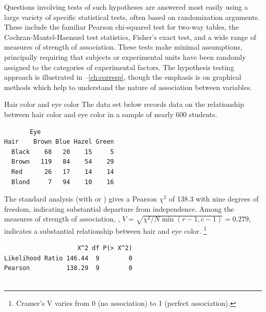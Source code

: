 \documentclass[10pt,krantz2]{krantz}\usepackage[]{graphicx}\usepackage[]{color}
\makeatletter
\newenvironment{kframe}{%
 \def\at@end@of@kframe{}%
 \ifinner\ifhmode%
  \def\at@end@of@kframe{\end{minipage}}%
  \begin{minipage}{\columnwidth}%
 \fi\fi%
 \def\FrameCommand##1{\hskip\@totalleftmargin \hskip-\fboxsep
 \colorbox{shadecolor}{##1}\hskip-\fboxsep
     \hskip-\linewidth \hskip-\@totalleftmargin \hskip\columnwidth}%
 \MakeFramed {\advance\hsize-\width
   \@totalleftmargin\z@ \linewidth\hsize
   \@setminipage}}%
 {\par\unskip\endMakeFramed%
 \at@end@of@kframe}
\newenvironment{knitrout}{}{} %
\renewenvironment{knitrout}{\small\renewcommand{\baselinestretch}{.85}}{} %
\makeatother
\begin{document}
Questions involving tests of such hypotheses are answered most easily
using a large variety of specific statistical tests, often based on
randomization arguments.
These include the familiar Pearson chi-squared test for two-way tables,
the Cochran-Mantel-Haenszel test statistics, Fisher's exact test, and a wide range of measures of strength of association.
These tests make minimal assumptions, principally requiring that subjects
or experimental units have been randomly assigned to the categories of
experimental factors.  The hypothesis testing approach is illustrated
in --\ref{ch:corresp}, though the emphasis is on graphical
methods which help to understand the nature of association between
variables.

\begin{Example}[haireye0]{Hair color and eye color}
%
The data set  below
records data on the relationship between hair color and eye color
in a sample of nearly 600 students.
\begin{knitrout}
\color{fgcolor}\begin{kframe}
\begin{verbatim}
       Eye
Hair    Brown Blue Hazel Green
  Black    68   20    15     5
  Brown   119   84    54    29
  Red      26   17    14    14
  Blond     7   94    10    16
\end{verbatim}
\end{kframe}
\end{knitrout}

The standard analysis (with  or )
gives a
Pearson \(\chi^2\) of 138.3 with nine degrees of freedom,
indicating substantial departure from independence.  Among the measures of
strength of association, , $V = \sqrt{\chi^2 / N \min(r-1,c-1)} = 0.279$,
indicates a substantial relationship between hair and eye color.%
\footnote{Cramer's V varies from 0 (no association) to 1 (perfect association).}



\begin{knitrout}
\color{fgcolor}\begin{kframe}
\begin{verbatim}
                    X^2 df P(> X^2)
Likelihood Ratio 146.44  9        0
Pearson          138.29  9        0


\end{verbatim}
\end{kframe}
\end{knitrout}
\end{Example}
\end{document}
